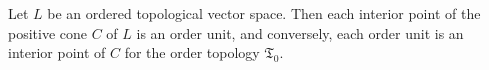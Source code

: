 Let $L$ be an ordered topological vector space. Then each interior point of the positive cone $C$ of $L$ is an order unit, and conversely, each order unit is an interior point of $C$ for the order topology $\mathfrak{T}_0$.
